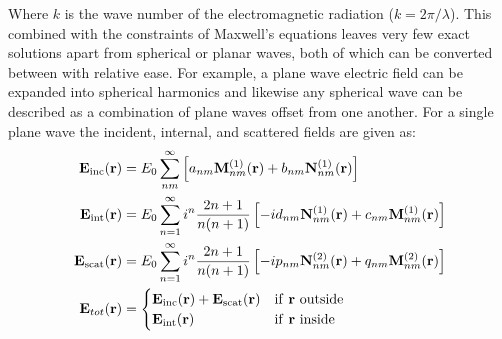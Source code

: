 Where $k$ is the wave number of the electromagnetic radiation 
($k = 2\pi/\lambda$). This combined with the constraints of 
Maxwell's equations leaves very few exact solutions apart from 
spherical or planar waves, both of which can be converted between 
with relative ease. For example, a plane wave electric field can 
be expanded into spherical harmonics and likewise any spherical 
wave can be described as a combination of plane waves offset from 
one another. For a single plane wave the incident, internal, and 
scattered fields are given as: 
\begin{align}
	\label{eq:incident}
	{\bf E}_{\rm inc}({\bf r})
	&=
    E_0 \sum_{nm}^\infty \left[
    a_{nm}{\bf M}_{nm}^{(1)}({\bf r})
    + b_{nm}{\bf N}_{nm}^{(1)}({\bf r})\right]
  \\
  \label{eq:internal}
  {\bf E}_{\rm int}({\bf r})
  &=
    E_0 \sum_{n=1}^\infty i^n\frac{2n+1}{n(n+1)}\left[
    -id_{nm}{\bf N}_{nm}^{(1)}({\bf r}) + c_{nm}{\bf M}_{nm}^{(1)}({\bf r})
    \right]
  \\
  \label{eq:scattered}
  {\bf E}_{\rm scat}({\bf r})
  &=
    E_0 \sum_{n=1}^\infty  i^n\frac{2n+1}{n(n+1)}\left[
      -i p_{nm}{\bf N}_{nm}^{(2)}({\bf r})+q_{nm}{\bf M}_{nm}^{(2)}({\bf r})
    \right] 
    \\
	\mathbf{E}_{tot}({\bf r}) &= 
	\begin{cases}
		{\bf E}_{\rm inc}({\bf r}) + {\bf E}_{\rm scat}({\bf r}) & \text{if \textbf{r} outside}
		\\ 
		{\bf E}_{\rm int}({\bf r}) & \text{if \textbf{r} inside}
	\end{cases}
\end{align}

